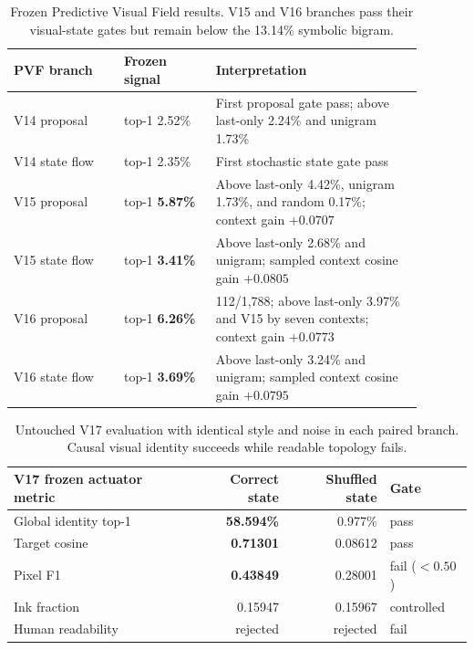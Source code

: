 \documentclass[11pt]{article}
\begin{document}
\begin{table}[t]
\centering
\small
\begin{tabular}{p{0.24\linewidth}p{0.20\linewidth}p{0.45\linewidth}}
\toprule
PVF branch & Frozen signal & Interpretation \\
\midrule
V14 proposal & top-1 2.52\% & First proposal gate pass; above last-only 2.24\% and unigram 1.73\% \\
V14 state flow & top-1 2.35\% & First stochastic state gate pass \\
V15 proposal & top-1 \textbf{5.87\%} & Above last-only 4.42\%, unigram 1.73\%, and random 0.17\%; context gain $+0.0707$ \\
V15 state flow & top-1 \textbf{3.41\%} & Above last-only 2.68\% and unigram; sampled context cosine gain $+0.0805$ \\
V16 proposal & top-1 \textbf{6.26\%} & 112/1,788; above last-only 3.97\% and V15 by seven contexts; context gain $+0.0773$ \\
V16 state flow & top-1 \textbf{3.69\%} & Above last-only 3.24\% and unigram; sampled context cosine gain $+0.0795$ \\
\bottomrule
\end{tabular}
\caption{Frozen Predictive Visual Field results. V15 and V16 branches pass their visual-state gates but remain below the 13.14\% symbolic bigram.}
\label{tab:pvfresults}
\end{table}

\begin{table}[t]
\centering
\small
\begin{tabular}{lrrl}
\toprule
V17 frozen actuator metric & Correct state & Shuffled state & Gate \\
\midrule
Global identity top-1 & \textbf{58.594\%} & 0.977\% & pass \\
Target cosine & \textbf{0.71301} & 0.08612 & pass \\
Pixel F1 & \textbf{0.43849} & 0.28001 & fail ($<0.50$) \\
Ink fraction & 0.15947 & 0.15967 & controlled \\
Human readability & rejected & rejected & fail \\
\bottomrule
\end{tabular}
\caption{Untouched V17 evaluation with identical style and noise in each paired branch. Causal visual identity succeeds while readable topology fails.}
\label{tab:v17actuator}
\end{table}
\end{document}
